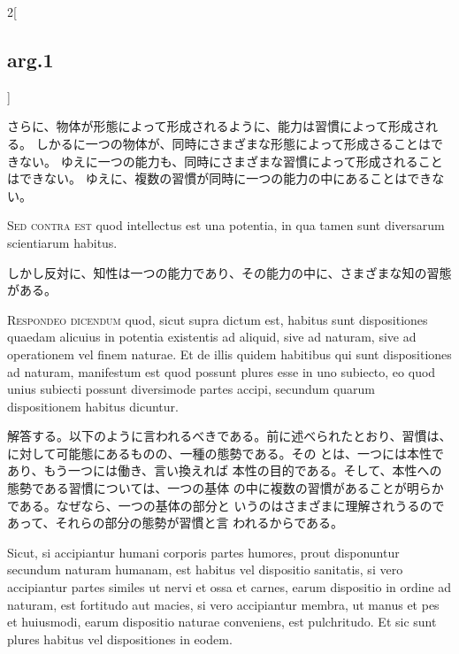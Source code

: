 \documentclass[paper=a4paper,fontsize=10pt,jafontsize=9pt,titlepage]{jlreq}
\begin{document}
\begin{paracol}{2}[\subsection{arg.1}]
\switchcolumn

さらに、物体が形態によって形成されるように、能力は習慣によって形成される。
しかるに一つの物体が、同時にさまざまな形態によって形成さることはできない。
ゆえに一つの能力も、同時にさまざまな習慣によって形成されることはできない。
ゆえに、複数の習慣が同時に一つの能力の中にあることはできない。

\switchcolumn*[\subsection{s.c.}]

{\scshape Sed contra est} quod intellectus est una potentia, in qua
tamen sunt diversarum scientiarum habitus.

\switchcolumn

しかし反対に、知性は一つの能力であり、その能力の中に、さまざまな知の習態がある。


{\scshape Respondeo dicendum} quod, sicut supra dictum est, habitus
sunt dispositiones quaedam alicuius in potentia existentis ad aliquid,
sive ad naturam, sive ad operationem vel finem naturae. Et de illis
quidem habitibus qui sunt dispositiones ad naturam, manifestum est
quod possunt plures esse in uno subiecto, eo quod unius subiecti
possunt diversimode partes accipi, secundum quarum dispositionem
habitus dicuntur.

\switchcolumn

解答する。以下のように言われるべきである。前に述べられたとおり、習慣は、
に対して可能態にあるものの、一種の態勢である。その
とは、一つには本性であり、もう一つには働き、言い換えれば
本性の目的である。そして、本性への態勢である習慣については、一つの基体
の中に複数の習慣があることが明らかである。なぜなら、一つの基体の部分と
いうのはさまざまに理解されうるのであって、それらの部分の態勢が習慣と言
われるからである。

\switchcolumn*

Sicut, si accipiantur humani corporis partes humores, prout
disponuntur secundum naturam humanam, est habitus vel dispositio
sanitatis, si vero accipiantur partes similes ut nervi et ossa et
carnes, earum dispositio in ordine ad naturam, est fortitudo aut
macies, si vero accipiantur membra, ut manus et pes et huiusmodi,
earum dispositio naturae conveniens, est pulchritudo. Et sic sunt
plures habitus vel dispositiones in eodem.


\end{paracol}
\end{document}
